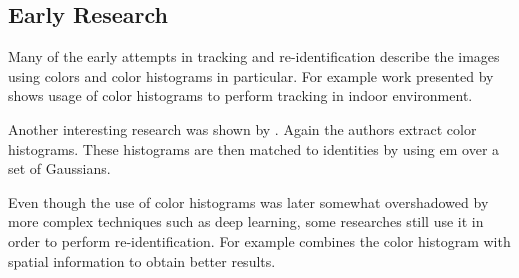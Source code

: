\subsection{Early Research}
\label{sec:early_research}





Many of the early attempts in tracking and re-identification describe the images
using colors and color histograms in particular. For example work presented by
\cite{krumm2000multi} shows usage of color histograms to perform tracking in
indoor environment.


Another interesting research was shown by \cite{orwell1999multi}. Again the
authors extract color histograms. These histograms are then matched to identities
by using \gls{em} over a set of Gaussians.

Even though the use of color histograms was later somewhat overshadowed by
more complex techniques such as deep learning, some researches still use it
in order to perform re-identification. For example \cite{zeng2014person}
combines the color histogram with spatial information to obtain better results.

